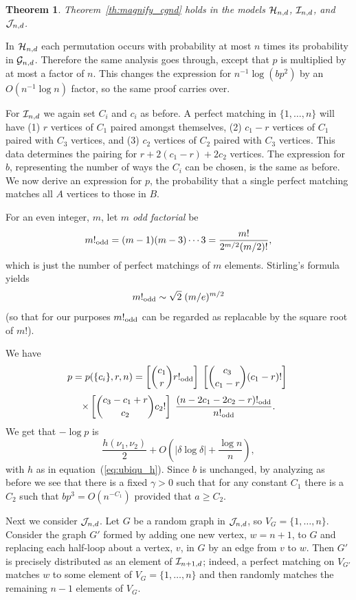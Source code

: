 \documentclass[12pt]{article}
\newtheorem{theorem}{Theorem}[section]
\newcommand{\cg}{{\cal G}}
\newcommand{\ch}{{\cal H}}
\newcommand{\ci}{{\cal I}}
\newcommand{\cj}{{\cal J}}
\newcommand{\cjnd}{\cj_{n,d}}
\newcommand{\cind}{\ci_{n,d}}
\newcommand{\cinpd}{\ci_{n+1,d}}
\newcommand{\cgnd}{\cg_{n,d}}
\newcommand{\chnd}{\ch_{n,d}}
\newcommand{\oddf}{!_{\rm odd}}
\newcommand{\intn}{{\{1,\ldots,n\}}}
\newcommand{\proof}{{\par\noindent {\bf Proof}\space\space}}
\begin{document}
\begin{theorem} Theorem~\ref{th:magnify_cgnd} holds in the models
$\chnd$, $\cind$, and $\cjnd$.
\end{theorem}
\proof
In $\chnd$ each permutation occurs with probability at most $n$ times
its probability in $\cgnd$.  Therefore the same analysis goes through,
except that $p$ is multiplied by at most a factor of $n$.  This changes
the expression for $n^{-1}\log(bp^2)$ by an $O(n^{-1}\log n)$ factor,
so the same proof carries over.

For $\cind$ we again set $C_i$ and $c_i$ as before.  A perfect matching
in $\intn$ will have
(1) $r$ vertices of $C_1$ paired amongst themselves,
(2) $c_1-r$ vertices of $C_1$ paired with $C_3$ vertices, and
(3) $c_2$ vertices of $C_2$ paired with $C_3$ vertices.
This data determines the pairing for $r+2(c_1-r)+2c_2$ vertices.
The expression for $b$, representing the number of ways the $C_i$ can
be chosen, is the same as before.  We now derive an
expression for $p$, the probability that a single perfect matching
matches all $A$ vertices to those in $B$.


For an even integer, $m$, let {\em $m$ odd factorial} be
$$
m\oddf = (m-1)(m-3)\cdots 3 = \frac{m!}{2^{m/2}(m/2)!},
$$
which is just
the number of perfect matchings of $m$ elements.  
Stirling's formula yields
$$
m\oddf \sim \sqrt{2}\;(m/e)^{m/2}
$$
(so that for our purposes $m\oddf$ can be regarded as replacable by
the square root of $m!$).

We have
$$
p=p(\{c_i\},r,n)=
\left[ \binom{c_1}{r} r\oddf \right]\;
\left[ \binom{c_3}{c_1-r} (c_1-r)! \right]\;
$$
$$
\times
\left[ \binom{c_3-c_1+r}{c_2} c_2! \right]\;
\frac{ (n-2c_1-2c_2-r)\oddf }{n\oddf}.
$$
We get that $-\log p$ is
$$
\frac{h(\nu_1,\nu_2)}{2} + 
O\left(|\delta\log\delta|+\frac{\log n}{n}\right),
$$
with $h$ as in equation~(\ref{eq:ubiqu_h}).
Since $b$ is unchanged,
by analyzing as before we see that there is a fixed $\gamma>0$ such that
for any constant $C_1$ there is a $C_2$ such that
$bp^3=O(n^{-C_1})$ provided that $a\ge C_2$.

Next we consider $\cjnd$.  Let $G$ be a random graph in $\cjnd$,
so $V_G=\intn$.
Consider the graph $G'$ formed by adding one new
vertex, $w=n+1$, to $G$ and replacing
each half-loop about a vertex, $v$, in $G$ by an edge from $v$ to $w$.
Then $G'$ is precisely distributed as an element of $\cinpd$; indeed,
a perfect matching on $V_{G'}$ matches $w$ to some element of $V_G=\intn$
and then randomly matches the remaining $n-1$ elements of $V_G$.
\end{document}
